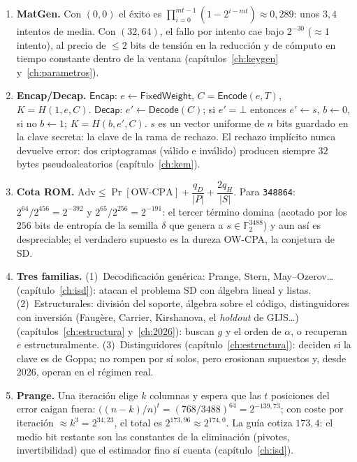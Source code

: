 \documentclass[11pt,a4paper,oneside]{report}
\newcommand{\F}{\mathbb{F}}
\newcommand{\Ftwo}{\F_2}
\begin{document}
\begin{enumerate}[leftmargin=1.9em,itemsep=5pt]
  \item \textbf{MatGen.} Con $(0,0)$ el éxito es
        $\prod_{i=0}^{mt-1}(1-2^{i-mt})\approx0{,}289$: unos
        $3{,}4$ intentos de media. Con $(32,64)$, el fallo por
        intento cae bajo $2^{-30}$ ($\approx1$ intento), al
        precio de $\le2$ bits de tensión en la reducción y de
        cómputo en tiempo constante dentro de la ventana
        (capítulos~\ref{ch:keygen} y~\ref{ch:parametros}).

  \item \textbf{Encap/Decap.}
        $\textsf{Encap}$: $e\leftarrow\textsf{FixedWeight}$,
        $C=\textsf{Encode}(e,T)$, $K=H(1,e,C)$.
        $\textsf{Decap}$: $e'\leftarrow\textsf{Decode}(C)$; si
        $e'=\bot$ entonces $e'\leftarrow s$, $b\leftarrow0$, si no
        $b\leftarrow1$; $K=H(b,e',C)$. $s$ es un vector uniforme
        de $n$ bits guardado en la clave secreta: la clave de la
        rama de rechazo. El rechazo implícito nunca devuelve
        error: dos criptogramas (válido e inválido) producen
        siempre $32$ bytes pseudoaleatorios (capítulo~\ref{ch:kem}).

  \item \textbf{Cota ROM.}
        $\mathrm{Adv}\le\Pr[\text{OW-CPA}]+\dfrac{q_D}{|P|}
        +\dfrac{2q_H}{|S|}$. Para \texttt{348864}:
        $2^{64}/2^{456}=2^{-392}$ y
        $2^{65}/2^{256}=2^{-191}$: el tercer término domina (acotado
        por los $256$ bits de entropía de la semilla $\delta$ que genera
        a $s\in\Ftwo^{3488}$) y aun así es despreciable; el verdadero
        supuesto es la dureza OW-CPA, la conjetura de SD.

  \item \textbf{Tres familias.} (1)~Decodificación genérica: Prange,
        Stern, May--Ozerov\dots (capítulo~\ref{ch:isd}): atacan el
        problema SD con álgebra lineal y listas. (2)~Estructurales:
        división del soporte, álgebra sobre el código, distinguidores
        con inversión (Faug\`ere, Carrier, Kirshanova, el
        \emph{holdout} de GIJS\dots) (capítulos~\ref{ch:estructura}
        y~\ref{ch:2026}): buscan $g$ y el orden de $\alpha$, o
        recuperan $e$ estructuralmente. (3)~Distinguidores
        (capítulo~\ref{ch:estructura}): deciden si la clave es de
        Goppa; no rompen por sí solos, pero erosionan supuestos y,
        desde 2026, operan en el régimen real.

  \item \textbf{Prange.} Una iteración elige $k$ columnas y espera
        que las $t$ posiciones del error caigan fuera:
        $\bigl((n-k)/n\bigr)^{t}=(768/3488)^{64}=2^{-139{,}73}$;
        con coste por iteración $\approx k^3=2^{34{,}23}$, el
        total es $2^{173{,}96}\approx2^{174{,}0}$. La guía cotiza
        $173{,}4$: el medio bit restante son las constantes de la
        eliminación (pivotes, invertibilidad) que el estimador
        fino sí cuenta (capítulo~\ref{ch:isd}).


\end{enumerate}
\end{document}
